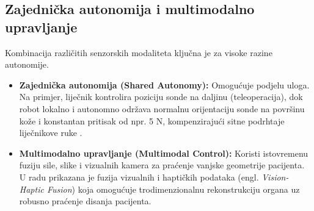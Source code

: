 \subsection{Zajednička autonomija i multimodalno upravljanje}
Kombinacija različitih senzorskih modaliteta ključna je za visoke razine autonomije.
\begin{itemize}
    \item \textbf{Zajednička autonomija (Shared Autonomy):} Omogućuje podjelu uloga. Na primjer, liječnik kontrolira poziciju sonde na daljinu (teleoperacija), dok robot lokalno i autonomno održava normalnu orijentaciju sonde na površinu kože i konstantan pritisak od npr. 5 N, kompenzirajući sitne podrhtaje liječnikove ruke \cite{akbari2021robotic}.
    \item \textbf{Multimodalno upravljanje (Multimodal Control):} Koristi istovremenu fuziju sile, slike i vizualnih kamera za praćenje vanjske geometrije pacijenta. U radu \cite{ieee2025respiratory} prikazana je fuzija vizualnih i haptičkih podataka (engl. \textit{Vision-Haptic Fusion}) koja omogućuje trodimenzionalnu rekonstrukciju organa uz robusno praćenje disanja pacijenta.
\end{itemize}
